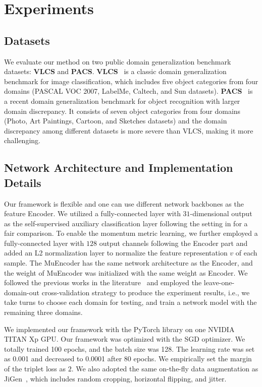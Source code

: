 \section{Experiments}

\subsection{Datasets}
We evaluate our method on two public domain generalization benchmark datasets: \textbf{VLCS} and \textbf{PACS}. \textbf{VLCS}~\cite{fang2013unbiased} is a classic domain generalization benchmark for image classification, which includes five object categories from four domains (PASCAL VOC 2007, LabelMe, Caltech, and Sun datasets).
\textbf{PACS}~\cite{li2017deeper} is a recent domain generalization benchmark for object recognition with larger domain discrepancy. It consists of seven object categories from four domains (Photo, Art Paintings, Cartoon, and Sketches datasets) and the domain discrepancy among different datasets is more severe than VLCS, making it more challenging. 



\subsection{Network Architecture and Implementation Details}
Our framework is flexible and one can use different network backbones as the feature Encoder. 
We utilized a fully-connected layer with $31$-dimensional output as the self-supervised auxiliary classification layer following the setting in \cite{carlucci2019domain} for a fair comparison. 
To enable the momentum metric learning, we further employed a fully-connected layer with $128$ output channels following the Encoder part and added an L2 normalization layer to normalize the feature representation $v$ of each sample.
The MuEncoder has the same network architecture as the Encoder, and the weight of MuEncoder was initialized with the same weight as Encoder.
We followed the previous works in the literature~\cite{balaji2018metareg,carlucci2019domain,li2018learning,dou2019domain} and employed the leave-one-domain-out cross-validation strategy to produce the experiment results, i.e., we take turns to choose each domain for testing, and train a network model with the remaining three domains.


We implemented our framework with the PyTorch library on one NVIDIA TITAN Xp GPU.
Our framework was optimized with the SGD optimizer. We totally trained 100 epochs, and the batch size was 128. 
The learning rate was set as 0.001 and decreased to 0.0001 after 80 epochs.
We empirically set the margin of the triplet loss as $2$.
We also adopted the same on-the-fly data augmentation as JiGen~\cite{carlucci2019domain}, which includes random cropping, horizontal flipping, and jitter.


